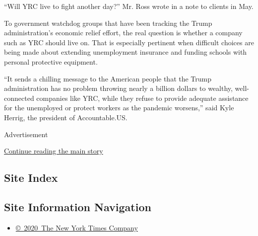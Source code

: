 ``Will YRC live to fight another day?'' Mr. Ross wrote in a note to
clients in May.

To government watchdog groups that have been tracking the Trump
administration's economic relief effort, the real question is whether a
company such as YRC should live on. That is especially pertinent when
difficult choices are being made about extending unemployment insurance
and funding schools with personal protective equipment.

``It sends a chilling message to the American people that the Trump
administration has no problem throwing nearly a billion dollars to
wealthy, well-connected companies like YRC, while they refuse to provide
adequate assistance for the unemployed or protect workers as the
pandemic worsens,'' said Kyle Herrig, the president of Accountable.US.

Advertisement

\protect\hyperlink{after-bottom}{Continue reading the main story}

\hypertarget{site-index}{%
\subsection{Site Index}\label{site-index}}

\hypertarget{site-information-navigation}{%
\subsection{Site Information
Navigation}\label{site-information-navigation}}

\begin{itemize}
\tightlist
\item
  \href{https://help.nytimes.com/hc/en-us/articles/115014792127-Copyright-notice}{©~2020~The
  New York Times Company}
\end{itemize}

